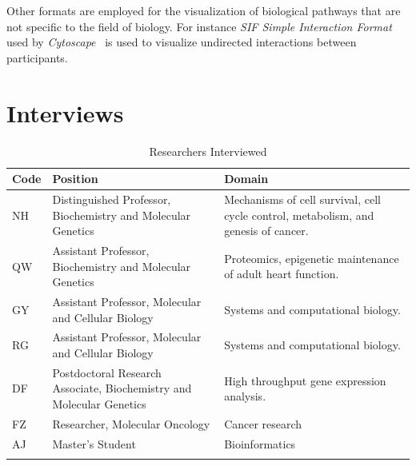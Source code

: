 \documentclass[review,journal]{vgtc}         %
\begin{document}
Other formats are employed for the visualization of biological pathways that are not specific to the field of biology. For instance \textit{SIF Simple Interaction Format} used by \textit{Cytoscape}~\cite{Shannon2003cytoscape} is used to visualize undirected interactions between participants.

\section{Interviews}

\begin{table}[htb]
 \caption{Researchers Interviewed}
 \label{vis_accept}
 \scriptsize
 \begin{center}
   \begin{tabular}{p{0.5cm}p{5cm}p{10cm}}
     Code & Position & Domain \\
   \hline
     NH 
     & Distinguished Professor, \newline Biochemistry and Molecular Genetics 
     & Mechanisms of cell survival, cell cycle control, metabolism, and genesis of cancer.
     \\ %
     QW 
     & Assistant Professor, \newline Biochemistry and Molecular Genetics 
     & Proteomics, epigenetic maintenance of adult heart function.
     \\ %
     GY
     & Assistant Professor, \newline Molecular and Cellular Biology
     & Systems and computational biology.
     \\ %
     RG
     & Assistant Professor, \newline Molecular and Cellular Biology
     & Systems and computational biology.
     \\ %
     DF
     & Postdoctoral Research Associate, \newline Biochemistry and Molecular Genetics
     & High throughput gene expression analysis.
     \\ %
     FZ
     & Researcher, \newline Molecular Oncology
     & Cancer research
     \\ %
     AJ
     & Master's Student
     & Bioinformatics
     \\ %
    \label{table:interviews}
   \end{tabular}
 \end{center}
\end{table}
\end{document}
